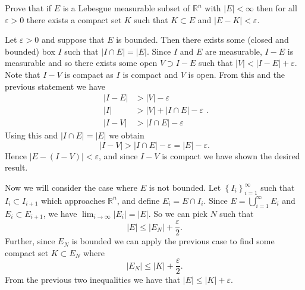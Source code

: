 
\begin{problem}{1}
  Prove that if $E$ is a Lebesgue measurable subset of $\mathbb{R}^{n}$ with $\left| E \right| < \infty$ then for all $\varepsilon > 0$ there exists a compact set $K$ such that $K \subset E$ and $\left| E - K \right| < \varepsilon$.
\end{problem}

\begin{solution}
  Let $\varepsilon > 0$ and suppose that $E$ is bounded.
  Then there exists some (closed and bounded) box $I$ such that $\left| I \cap E \right| = |E|$.
  Since $I$ and $E$ are measurable, $I - E$ is measurable and so there exists some open $V \supset I - E$ such that $\left| V \right| < \left| I - E \right| + \varepsilon$.
  Note that $I - V$ is compact as $I$ is compact and $V$ is open.
  From this and the previous statement we have 
  \[
    \begin{aligned}
     \left| I - E \right| &> \left| V \right| - \varepsilon \\
     \left| I \right| &> \left| V \right| + \left| I \cap E \right| - \varepsilon \\
     \left| I - V \right| &> \left| I \cap E \right| - \varepsilon     
    \end{aligned}
  .\] 
  Using this and $\left| I \cap E \right| = \left| E \right|$ we obtain 
  \[
  \left| I - V \right| > \left| I \cap E \right| - \varepsilon = \left| E \right| - \varepsilon
  .\] 
  Hence $\left| E - (I - V) \right| < \varepsilon$, and since $I - V$ is compact we have shown the desired result.

  Now we will consider the case where $E$ is not bounded.
  Let $\left\{ I_{i} \right\}_{i=1}^{\infty}$ such that $I_{i} \subset I_{i+1}$ which approaches $\mathbb{R}^{n}$, and define $E_{i} = E \cap I_{i}$.
  Since $E = \bigcup_{i=1}^{\infty} E_{i} $ and $E_{i} \subset E_{i+1}$, we have $\lim_{i \to \infty} \left| E_{i} \right| = \left| E \right|$.
  So we can pick $N$ such that
  \[
  \left| E \right| \leq \left| E_{N} \right| + \frac{\varepsilon}{2}
  .\] 
  Further, since $E_{N}$ is bounded we can apply the previous case to find some compact set $K \subset E_{N}$ where
  \[
  \left| E_{N} \right| \leq \left| K \right| + \frac{\varepsilon}{2}
  .\] 
  From the previous two inequalities we have that $\left| E \right| \leq \left| K \right| + \varepsilon$.
  

\end{solution}

